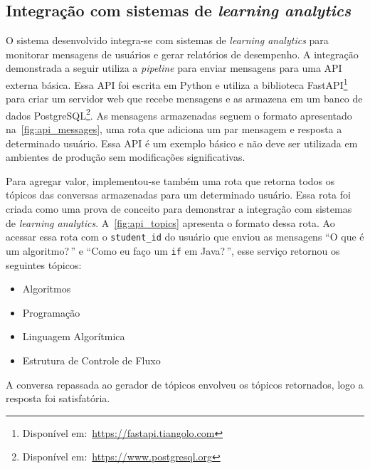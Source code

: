 \documentclass[journal]{IEEEtran}
\begin{document}
\subsection{Integração com sistemas de \textit{learning analytics}\label{sec:learning_analytics}}

\noindent%
O sistema desenvolvido integra-se com sistemas de \textit{learning analytics} para monitorar mensagens de usuários e gerar relatórios de desempenho.
A integração demonstrada a seguir utiliza a \textit{pipeline} para enviar mensagens para uma API externa básica.
Essa API foi escrita em Python e utiliza a biblioteca FastAPI\footnote{%
Disponível em:~\url{https://fastapi.tiangolo.com}} para criar um servidor web que recebe mensagens e as armazena em um banco de dados PostgreSQL\footnote{%
Disponível em:~\url{https://www.postgresql.org}}.
As mensagens armazenadas seguem o formato apresentado na~\cref{fig:api_messages}, uma rota que adiciona um par  mensagem e resposta a determinado usuário.
Essa API é um exemplo básico e não deve ser utilizada em ambientes de produção sem modificações significativas.

Para agregar valor, implementou-se também uma rota que retorna todos os tópicos das conversas armazenadas para um determinado usuário.
Essa rota foi criada como uma prova de conceito para demonstrar a integração com sistemas de \textit{learning analytics}.
A~\cref{fig:api_topics} apresenta o formato dessa rota.
Ao acessar essa rota com o \texttt{student\_id} do usuário que enviou as mensagens ``O que é um algoritmo?\,'' e ``Como eu faço um \texttt{if} em Java?\,'', esse serviço retornou os seguintes tópicos:

\begin{itemize}
    \item Algoritmos
    \item Programação
    \item Linguagem Algorítmica
    \item Estrutura de Controle de Fluxo
\end{itemize}

A conversa repassada ao gerador de tópicos envolveu os tópicos retornados, logo a resposta foi satisfatória.
\end{document}
